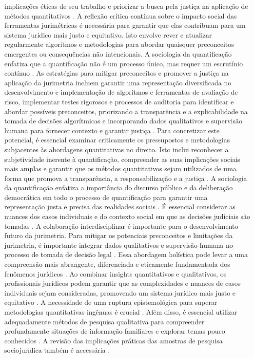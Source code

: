 implicações éticas de seu trabalho e priorizar a busca pela justiça na aplicação de métodos quantitativos \cite{10.1007/s11186-021-09453-1,10.3390/fi9040068}. A reflexão crítica contínua sobre o impacto social das ferramentas jurimétricas é necessária para garantir que elas contribuam para um sistema jurídico mais justo e equitativo. Isto envolve rever e atualizar regularmente algoritmos e metodologias para abordar quaisquer preconceitos emergentes ou consequências não intencionais. A sociologia da quantificação enfatiza que a quantificação não é um processo único, mas requer um escrutínio contínuo \cite{10.1590/dados.2022.65.3.267,10.3390/fi9040068}. As estratégias para mitigar preconceitos e promover a justiça na aplicação da jurimetria incluem garantir uma representação diversificada no desenvolvimento e implementação de algoritmos e ferramentas de avaliação de risco, implementar testes rigorosos e processos de auditoria para identificar e abordar possíveis preconceitos, priorizando a transparência e a explicabilidade na tomada de decisões algorítmicas e incorporando dados qualitativos e supervisão humana para fornecer contexto e garantir justiça \cite{10.1007/s11186-021-09453-1,10.3390/fi9040068}. Para concretizar este potencial, é essencial examinar criticamente os pressupostos e metodologias subjacentes às abordagens quantitativas no direito. Isto inclui reconhecer a subjetividade inerente à quantificação, compreender as suas implicações sociais mais amplas e garantir que os métodos quantitativos sejam utilizados de uma forma que promova a transparência, a responsabilização e a justiça \cite{10.1590/dados.2022.65.3.267,10.3390/fi9040068}. A sociologia da quantificação enfatiza a importância do discurso público e da deliberação democrática em todo o processo de quantificação para garantir uma representação justa e precisa das realidades sociais \cite{10.1590/dados.2022.65.3.267,10.3390/fi9040068}. É essencial considerar as nuances dos casos individuais e do contexto social em que as decisões judiciais são tomadas \cite{10.1007/s11186-021-09453-1,10.3390/fi9040068}. A colaboração interdisciplinar é importante para o desenvolvimento futuro da jurimetria. Para mitigar os potenciais preconceitos e limitações da jurimetria, é importante integrar dados qualitativos e supervisão humana no processo de tomada de decisão legal \cite{10.1590/dados.2022.65.3.267,10.1057/s41599-020-00557-0}. Essa abordagem holística pode levar a uma compreensão mais abrangente, diferenciada e eticamente fundamentada dos fenômenos jurídicos \cite{10.1590/dados.2022.65.3.267,10.1057/s41599-020-00557-0}. Ao combinar insights quantitativos e qualitativos, os profissionais jurídicos podem garantir que as complexidades e nuances de casos individuais sejam consideradas, promovendo um sistema jurídico mais justo e equitativo \cite{10.1590/dados.2022.65.3.267,10.1057/s41599-020-00557-0 }. A necessidade de uma ruptura epistemológica para superar metodologias quantitativas ingênuas é crucial \cite{calvo2024}. Além disso, é essencial utilizar adequadamente métodos de pesquisa qualitativa para compreender profundamente situações de informação familiares e explorar temas pouco conhecidos \cite{calvo2024}. A revisão das implicações práticas das amostras de pesquisa sociojurídica também é necessária \cite{calvo2024}. 

